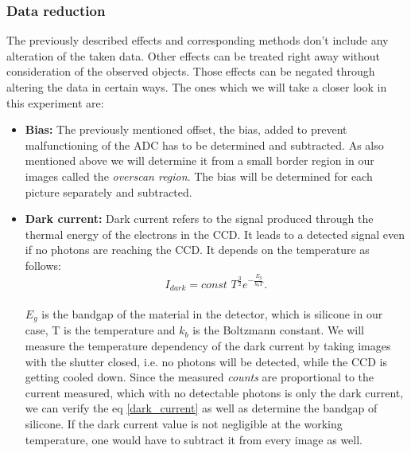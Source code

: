 \subsubsection{Data reduction}\label{reduction}
The previously described effects and corresponding methods don't include any alteration of the taken data. Other effects can be treated right away without consideration of the observed objects. Those effects can be negated through altering the data in certain ways. The ones which we will take a closer look in this experiment are:
\begin{itemize}
\item\textbf{Bias:}
The previously mentioned offset, the bias, added to prevent malfunctioning of the ADC has to be determined and subtracted. As also mentioned above we will determine it from a small border region in our images called the \textit{overscan region}. The bias will be determined for each picture separately and subtracted.

\item\textbf{Dark current:}
Dark current refers to the signal produced through the thermal energy of the electrons in the CCD. It leads to a detected signal even if no photons are reaching the CCD. It depends on the temperature as follows:
\begin{equation}\label{dark_current}
	I_{dark} = \textit{const } T^{\frac{3}{2}} e^{- \frac{E_g}{k_b T}}.	
\end{equation} \\
$E_g$ is the bandgap of the material in the detector, which is silicone in our case, T is the temperature and $k_b$ is the Boltzmann constant. We will measure the temperature dependency of the dark current by taking images with the shutter closed, i.e. no photons will be detected, while the CCD is getting cooled down. Since the measured \textit{counts} are proportional to the current measured, which with no detectable photons is only the dark current, we can verify the eq \eqref{dark_current} as well as determine the bandgap of silicone. If the dark current value is not negligible at the working temperature, one would have to subtract it from every image as well.


\end{itemize}
